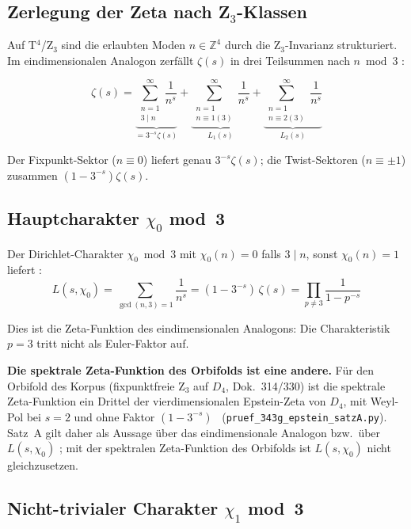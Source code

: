 \subsection{Zerlegung der Zeta nach Z$_3$-Klassen}

Auf T$^4$/Z$_3$ sind die erlaubten Moden $n \in \mathbb{Z}^4$ durch die
Z$_3$-Invarianz strukturiert. Im eindimensionalen Analogon zerfällt
$\zeta(s)$ in drei Teilsummen nach $n \bmod 3$ \BM:

\begin{equation}
  \zeta(s) = \underbrace{\sum_{\substack{n=1\\3\mid n}}^\infty \frac{1}{n^s}}_{= 3^{-s}\zeta(s)}
  + \underbrace{\sum_{\substack{n=1\\n\equiv 1(3)}}^\infty \frac{1}{n^s}}_{L_1(s)}
  + \underbrace{\sum_{\substack{n=1\\n\equiv 2(3)}}^\infty \frac{1}{n^s}}_{L_2(s)}
\end{equation}

Der Fixpunkt-Sektor ($n \equiv 0$) liefert genau $3^{-s}\zeta(s)$; die
Twist-Sektoren ($n \equiv \pm 1$) zusammen $(1 - 3^{-s})\zeta(s)$.

\subsection{Hauptcharakter $\chi_0$ mod~3}

Der Dirichlet-Charakter $\chi_0 \bmod 3$ mit $\chi_0(n) = 0$ falls $3 \mid n$,
sonst $\chi_0(n) = 1$ liefert \BM:
\begin{equation}
  L(s,\chi_0) = \sum_{\gcd(n,3)=1} \frac{1}{n^s}
  = (1 - 3^{-s})\,\zeta(s)
  = \prod_{p \neq 3} \frac{1}{1-p^{-s}}
\end{equation}

Dies ist die Zeta-Funktion des eindimensionalen Analogons: Die
Charakteristik $p=3$ tritt nicht als Euler-Faktor auf.

\textbf{Die spektrale Zeta-Funktion des Orbifolds ist eine andere.} Für den
Orbifold des Korpus (fixpunktfreie Z$_3$ auf $D_4$, Dok.~314/330) ist die
spektrale Zeta-Funktion ein Drittel der vierdimensionalen Epstein-Zeta von $D_4$,
mit Weyl-Pol bei $s=2$ und ohne Faktor $(1-3^{-s})$ \BM\
(\texttt{pruef\_343g\_epstein\_satzA.py}). Satz~A gilt daher als Aussage über
das eindimensionale Analogon bzw.\ über $L(s,\chi_0)$ \BM; mit der spektralen
Zeta-Funktion des Orbifolds ist $L(s,\chi_0)$ nicht gleichzusetzen.

\subsection{Nicht-trivialer Charakter $\chi_1$ mod~3}

